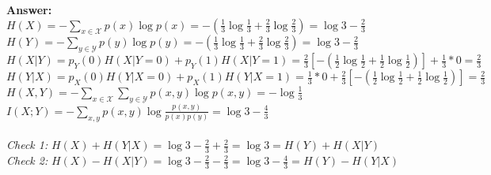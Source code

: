 \documentclass[12pt]{article}
\begin{document}
	\textbf{Answer:} \\
	$H(X) = -\sum_{x\in\mathcal{X}}p(x)\log p(x) = -(\frac{1}{3}\log\frac{1}{3} + \frac{2}{3}\log\frac{2}{3}) = \log3-\frac{2}{3}$\\
	$H(Y) = -\sum_{y\in\mathcal{Y}}p(y)\log p(y) = -(\frac{1}{3}\log\frac{1}{3} + \frac{2}{3}\log\frac{2}{3}) = \log3-\frac{2}{3}$ \\
	$H(X|Y) = p_Y(0)H(X|Y=0)+p_Y(1)H(X|Y=1) = \frac{2}{3}[-(\frac{1}{2}\log\frac{1}{2} + \frac{1}{2}\log\frac{1}{2})] + \frac{1}{3}*0 = \frac{2}{3}$ \\
	$H(Y|X) = p_X(0)H(Y|X=0)+p_X(1)H(Y|X=1) = \frac{1}{3}*0 + \frac{2}{3}[-(\frac{1}{2}\log\frac{1}{2} + \frac{1}{2}\log\frac{1}{2})] = \frac{2}{3}$ \\
	$H(X,Y) = -\sum_{x\in\mathcal{X}}\sum_{y\in\mathcal{Y}}p(x,y)\log p(x,y) = -\log\frac{1}{3}$ \\
	$I(X;Y) = -\sum_{x,y}p(x,y)\log\frac{p(x,y)}{p(x)p(y)} = \log3-\frac{4}{3}$ \\
	\\
	\textit{Check 1:} $H(X)+H(Y|X) = \log3 - \frac{2}{3} + \frac{2}{3} = \log3 = H(Y) + H(X|Y)$ \\
	\textit{Check 2:} $H(X)-H(X|Y) = \log3-\frac{2}{3} - \frac{2}{3} = \log3-\frac{4}{3} = H(Y) - H(Y|X)$ \\
	\\
\end{document}
